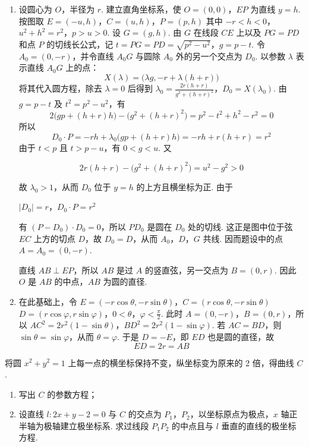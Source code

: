\begin{solution}
\begin{enumerate}
\item
设圆心为 \(O\)，半径为 \(r\). 建立直角坐标系，使 \(O=(0,0)\)，\(EP\) 为直线 \(y=h\). 按图取
\(E=(-u,h)\)，\(C=(u,h)\)，\(P=(p,h)\)
其中 \(-r<h<0\)，\(u^2+h^2=r^2\)，\(p>u>0\). 设 \(G=(g,h)\). 由 \(G\) 在线段 \(CE\) 上以及 \(PG=PD\) 和点 \(P\) 的切线长公式，记
\(t=PG=PD=\sqrt{p^2-u^2}\)，\(g=p-t\).
令 \(A_0=(0,-r)\)，并令直线 \(A_0G\) 与圆除 \(A_0\) 外的另一个交点为 \(D_0\). 以参数 \(\lambda\) 表示直线 \(A_0G\) 上的点：
\[
X(\lambda)=\bigl(\lambda g,-r+\lambda(h+r)\bigr)
\]
将其代入圆方程，除去 \(\lambda=0\) 后得到
\(\lambda_0=\frac{2r(h+r)}{g^2+(h+r)^2}\)，\(D_0=X(\lambda_0)\).
由 \(g=p-t\) 及 \(t^2=p^2-u^2\)，有
\[
2\bigl(gp+(h+r)h\bigr)-\bigl(g^2+(h+r)^2\bigr)
=p^2-t^2+h^2-r^2=0
\]
所以
\[
D_0\cdot P=-rh+\lambda_0\bigl(gp+(h+r)h\bigr)
=-rh+r(h+r)=r^2
\]
由于 \(t<p\) 且 \(t>p-u\)，有 \(0<g<u\). 又

\[
2r(h+r)-\bigl(g^2+(h+r)^2\bigr)=u^2-g^2>0
\]

故 \(\lambda_0>1\)，从而 \(D_0\) 位于 \(y=h\) 的上方且横坐标为正. 由于

\(\lvert D_0\rvert=r\)，\(D_0\cdot P=r^2\)

有 \((P-D_0)\cdot D_0=0\)，所以 \(PD_0\) 是圆在 \(D_0\) 处的切线. 这正是图中位于弦 \(EC\) 上方的切点 \(D\)，故 \(D_0=D\)，从而 \(A_0\)，\(D\)，\(G\) 共线. 因而题设中的点 \(A=A_0=(0,-r)\).

直线 \(AB\perp EP\)，所以 \(AB\) 是过 \(A\) 的竖直弦，另一交点为 \(B=(0,r)\). 因此 \(O\) 是 \(AB\) 的中点，\(AB\) 为圆的直径.

\item
在此基础上，令
\(E=(-r\cos\theta,-r\sin\theta)\)，\(C=(r\cos\theta,-r\sin\theta)\)
\(D=(r\cos\varphi,r\sin\varphi)\)，\(0<\theta\)，\(\varphi<\frac\pi2\).
此时 \(A=(0,-r)\)，\(B=(0,r)\)，所以
\(AC^2=2r^2(1-\sin\theta)\)，\(BD^2=2r^2(1-\sin\varphi)\).
若 \(AC=BD\)，则 \(\sin\theta=\sin\varphi\)，从而 \(\theta=\varphi\). 于是 \(D=-E\)，即 \(ED\) 也是圆的直径，故
\[
ED=2r=AB
\]
\end{enumerate}
\end{solution}

\begin{problem}
将圆 \(x^{2} + y^{2} = 1\) 上每一点的横坐标保持不变，纵坐标变为原来的 2 倍，得曲线 \(C\).

\begin{enumerate}
\item 写出 \(C\) 的参数方程；
\item 设直线 \(l: 2x + y - 2 = 0\) 与 \(C\) 的交点为 \(P_{1}\)，\(P_{2}\)，以坐标原点为极点，\(x\) 轴正半轴为极轴建立极坐标系. 求过线段 \(P_{1}P_{2}\) 的中点且与 \(l\) 垂直的直线的极坐标方程.
\end{enumerate}
\end{problem}

